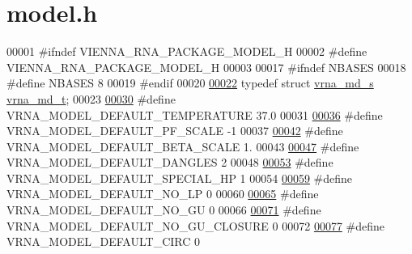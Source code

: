 \hypertarget{model_8h_source}{}\section{model.\+h}
\label{model_8h_source}

\begin{DoxyCode}
00001 \textcolor{preprocessor}{#ifndef VIENNA\_RNA\_PACKAGE\_MODEL\_H}
00002 \textcolor{preprocessor}{#define VIENNA\_RNA\_PACKAGE\_MODEL\_H}
00003 
00017 \textcolor{preprocessor}{#ifndef NBASES}
00018 \textcolor{preprocessor}{#define NBASES 8}
00019 \textcolor{preprocessor}{#endif}
00020 
\hyperlink{group__model__details_ga1f8a10e12a0a1915f2a4eff0b28ea17c}{00022} \textcolor{keyword}{typedef} \textcolor{keyword}{struct }\hyperlink{group__model__details_structvrna__md__s}{vrna\_md\_s} \hyperlink{group__model__details_structvrna__md__s}{vrna\_md\_t};
00023 
\hyperlink{group__model__details_gaf47f9850b3b4763479f7a7e7a15648a2}{00030} \textcolor{preprocessor}{#define VRNA\_MODEL\_DEFAULT\_TEMPERATURE    37.0}
00031 
\hyperlink{group__model__details_ga5505389cba74a18bbc116d2bb20256fa}{00036} \textcolor{preprocessor}{#define VRNA\_MODEL\_DEFAULT\_PF\_SCALE       -1}
00037 
\hyperlink{group__model__details_ga383d3ac8d08c3b6221754b50871c1200}{00042} \textcolor{preprocessor}{#define VRNA\_MODEL\_DEFAULT\_BETA\_SCALE     1.}
00043 
\hyperlink{group__model__details_ga2aa7bc2cae774b83a5c468f824c27a42}{00047} \textcolor{preprocessor}{#define VRNA\_MODEL\_DEFAULT\_DANGLES        2}
00048 
\hyperlink{group__model__details_gabd1ab224e1048defd45c165ed7d1c108}{00053} \textcolor{preprocessor}{#define VRNA\_MODEL\_DEFAULT\_SPECIAL\_HP     1}
00054 
\hyperlink{group__model__details_gab72462726dd60ed0d43339bbf7ee08ad}{00059} \textcolor{preprocessor}{#define VRNA\_MODEL\_DEFAULT\_NO\_LP          0}
00060 
\hyperlink{group__model__details_ga34702f7d14d38b877ba8e475281e97e2}{00065} \textcolor{preprocessor}{#define VRNA\_MODEL\_DEFAULT\_NO\_GU          0}
00066 
\hyperlink{group__model__details_ga5308de46faaca4b9fd16045864901ee7}{00071} \textcolor{preprocessor}{#define VRNA\_MODEL\_DEFAULT\_NO\_GU\_CLOSURE  0}
00072 
\hyperlink{group__model__details_ga22059033db7bcd875c51fec32425490a}{00077} \textcolor{preprocessor}{#define VRNA\_MODEL\_DEFAULT\_CIRC           0}

\end{DoxyCode}
